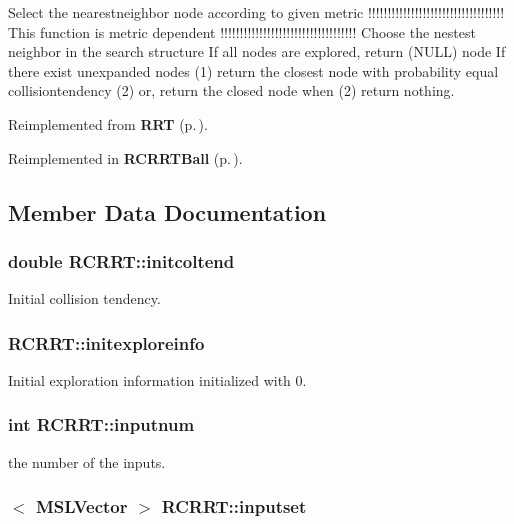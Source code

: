 Select the nearestneighbor node according to given metric !!!!!!!!!!!!!!!!!!!!!!!!!!!!!!!!!!! This function is metric dependent !!!!!!!!!!!!!!!!!!!!!!!!!!!!!!!!!!! Choose the nestest neighbor in the search structure If all nodes are explored, return (NULL) node If there exist unexpanded nodes (1) return the closest node with probability equal collisiontendency (2) or, return the closed node when (2) return nothing.



Reimplemented from {\bf RRT} {\rm (p.\,\pageref{classRRT_b1})}.

Reimplemented in {\bf RCRRTBall} {\rm (p.\,\pageref{classRCRRTBall_a2})}.

\subsection{Member Data Documentation}
\subsubsection{\setlength{\rightskip}{0pt plus 5cm}double RCRRT::initcoltend}\label{classRCRRT_m4}


Initial collision tendency.

\subsubsection{ RCRRT::initexploreinfo}\label{classRCRRT_m3}


Initial exploration information initialized with 0.

\subsubsection{\setlength{\rightskip}{0pt plus 5cm}int RCRRT::inputnum}\label{classRCRRT_m0}


the number of the inputs.

\subsubsection{$<$ {\bf MSLVector} $>$ RCRRT::inputset}\label{classRCRRT_m1}


